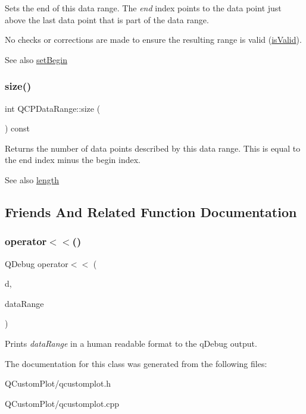 Sets the end of this data range. The {\itshape end} index points to the data point just above the last data point that is part of the data range.

No checks or corrections are made to ensure the resulting range is valid (\mbox{\hyperlink{class_q_c_p_data_range_aae53a37472212dca0a7939963e20dba0}{is\+Valid}}).

\begin{DoxySeeAlso}{See also}
\mbox{\hyperlink{class_q_c_p_data_range_a54ff59048e01e46ac4aefafc844626c6}{set\+Begin}} 
\end{DoxySeeAlso}
\mbox{\label{class_q_c_p_data_range_ac6af055e509d1b691c244954ff1c5887}} 
\subsubsection{\texorpdfstring{size()}{size()}}
{\footnotesize\ttfamily int Q\+C\+P\+Data\+Range\+::size (\begin{DoxyParamCaption}{ }\end{DoxyParamCaption}) const\hspace{0.3cm}{\ttfamily [inline]}}

Returns the number of data points described by this data range. This is equal to the end index minus the begin index.

\begin{DoxySeeAlso}{See also}
\mbox{\hyperlink{class_q_c_p_data_range_a1e7836058f755c6ab9f11996477b7150}{length}} 
\end{DoxySeeAlso}


\subsection{Friends And Related Function Documentation}
\mbox{\label{class_q_c_p_data_range_a486dd7af8a090ed069672e3510e6a082}} 
\subsubsection{\texorpdfstring{operator$<$$<$()}{operator<<()}}
{\footnotesize\ttfamily Q\+Debug operator$<$$<$ (\begin{DoxyParamCaption}\item[{Q\+Debug}]{d,  }\item[{const \mbox{\hyperlink{class_q_c_p_data_range}{Q\+C\+P\+Data\+Range}} \&}]{data\+Range }\end{DoxyParamCaption})\hspace{0.3cm}{\ttfamily [related]}}

Prints {\itshape data\+Range} in a human readable format to the q\+Debug output. 

The documentation for this class was generated from the following files\+:\begin{DoxyCompactItemize}
\item 
Q\+Custom\+Plot/qcustomplot.\+h\item 
Q\+Custom\+Plot/qcustomplot.\+cpp\end{DoxyCompactItemize}
